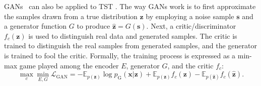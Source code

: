 GANs~ can also be applied to TST . The way GANs work is to first approximate the samples drawn from a true distribution $\bm{z}$ by employing a noise sample $\bm{s}$ and a generator function $G$ to produce $\widehat{\bm{z}} = G(\bm{s})$. Next, a critic/discriminator $f_c(\bm{z})$ is used to distinguish real data and generated samples. The critic is trained to distinguish the real samples from generated samples, and the generator is trained to fool the critic. Formally, the training process is expressed as a min-max game played among the encoder $E$, generator $G$, and the critic $f_c$:
\begin{equation}
    \max_{c}\min_{E,G}\mathcal{L}_{\mathrm{GAN}}
    = -\mathbb{E}_{p(\bm{z})}\log p_{\mathrm{G}}(\bm{x}|\bm{z}) +\mathbb{E}_{p(\bm{z})}f_c(\bm{z})-\mathbb{E}_{p(\widehat{\bm{z}})}f_c(\widehat{\bm{z}}).
\end{equation}

